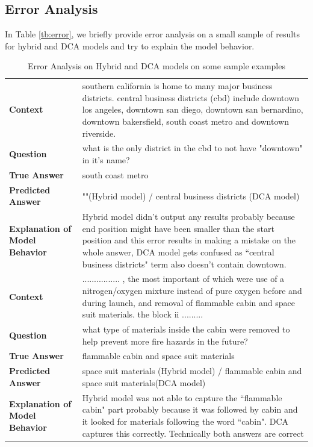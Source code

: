 \documentclass{article} %
\begin{document}
\subsection{Error Analysis}
In Table \ref{tb:error}, we briefly provide error analysis on a small sample of results for hybrid and DCA models and try to explain the model behavior.
\begin{center}
\begin{table}[ht]
\caption{Error Analysis on Hybrid and DCA models on some sample examples}
{\small
\hfill{}
     \begin{tabular}{ p{4cm}  p{10cm} }
    \hline
    \bfseries Context 			  & southern california is home to many major business districts. central business districts (cbd) include downtown los angeles, downtown san diego, downtown san bernardino, downtown bakersfield, south coast metro and downtown riverside.\\ 
    \bfseries Question    		  & what is the only district in the cbd to not have "downtown" in it's name?\\
    \bfseries True Answer   	  	  & south coast metro\\
    \bfseries Predicted Answer   	  &  ""(Hybrid model) / central business districts (DCA model)\\
    \bfseries Explanation of Model Behavior   & Hybrid model didn't output any results probably because end position might have been smaller than the start position and this error results in making a mistake on the whole answer, DCA model gets confused as ``central business districts"  term also doesn't contain downtown.\\
    \hline
    \bfseries Context 			  &................ , the most important of which were use of a nitrogen/oxygen mixture instead of pure oxygen before and during launch, and removal of flammable cabin and space suit materials. the block ii .........\\ 
    \bfseries Question    		  & what type of materials inside the cabin were removed to help prevent more fire hazards in the future?\\
    \bfseries True Answer   	  	  & flammable cabin and space suit materials\\
    \bfseries Predicted Answer   	  &  space suit materials (Hybrid model) / flammable cabin and space suit materials(DCA model)\\
    \bfseries Explanation of Model Behavior   & Hybrid model was not able to capture the ``flammable cabin" part probably because it was followed by cabin and it looked for materials following the word ``cabin". DCA captures this correctly. Technically both answers are correct\\
    

\end{tabular}}
\end{table}
\end{center}
\end{document}
